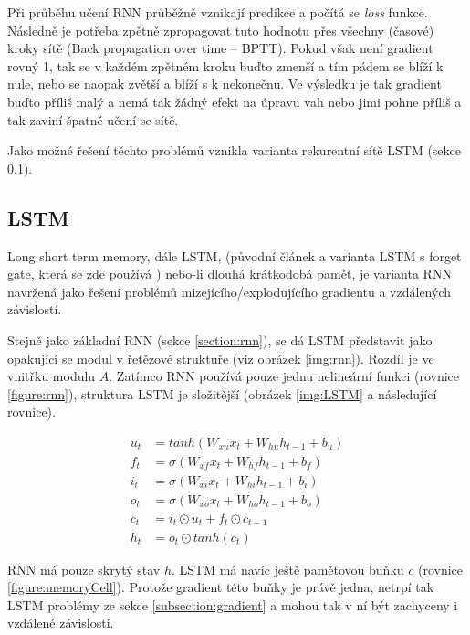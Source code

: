 Při průběhu učení RNN průběžně vznikají predikce a počítá se \emph{loss} funkce. Následně je potřeba zpětně zpropagovat tuto hodnotu přes všechny (časové) kroky sítě (Back propagation over time -- BPTT). Pokud však není gradient rovný 1, tak se v každém zpětném kroku buďto zmenší a tím pádem se blíží k nule, nebo se naopak zvětší a blíží s k nekonečnu. Ve výsledku je tak gradient buďto příliš malý a nemá tak žádný efekt na úpravu vah nebo jimi pohne příliš a tak zaviní špatné učení se sítě.

Jako možné řešení těchto problémů vznikla varianta rekurentní sítě LSTM (sekce \ref{section:LSTM}).


\subsection{LSTM}\label{section:LSTM}
Long short term memory, dále LSTM, (původní článek \cite{LSTM} a varianta LSTM s forget gate, která se zde používá \cite{forgetLSTM}) nebo-li dlouhá krátkodobá paměť, je varianta RNN navržená jako řešení problémů mizejícího/explodujícího gradientu a vzdálených závislostí.

Stejně jako základní RNN (sekce \ref{section:rnn}), se dá LSTM představit jako opakující se modul v řetězové struktuře (viz obrázek \ref{img:rnn}). Rozdíl je ve vnitřku modulu $A$. Zatímco RNN používá pouze jednu nelineární funkci (rovnice \ref{figure:rnn}), struktura LSTM je složitější (obrázek \ref{img:LSTM} a následující rovnice).

\begin{align}
    u_{t}&=tanh(W_{xu}x_t + W_{hu}h_{t-1} + b_u) \label{figure:update} \\
    f_{t}&=\sigma(W_{xf}x_{t}+W_{hf}h_{t-1}+b_{f}) \label{figure:forgetGate} \\
    i_{t}&=\sigma(W_{xi}x_{t}+W_{hi}h_{t-1}+b_{i}) \label{figure:inputGate} \\
    o_{t}&=\sigma(W_{xo}x_{t}+W_{ho}h_{t-1}+b_{o}) \label{figure:outputGate} \\
    c_{t}&=i_{t}\odot u_{t}+f_{t}\odot c_{t-1}\label{figure:memoryCell} \\
    h_{t}&=o_{t}\odot tanh(c_{t}) \label{figure:hiddenState}
\end{align}

RNN má pouze skrytý stav $h$. LSTM má navíc ještě paměťovou buňku $c$ (rovnice \ref{figure:memoryCell}). Protože gradient této buňky je právě jedna, netrpí tak LSTM problémy ze sekce \ref{subsection:gradient} a mohou tak v ní být zachyceny i vzdálené závislosti.

